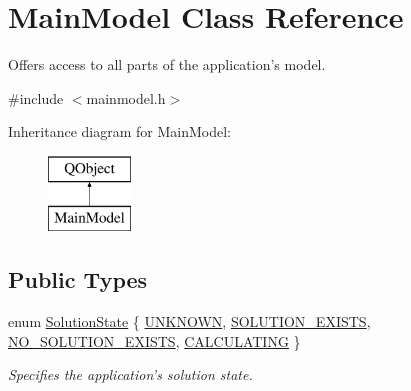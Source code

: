 \hypertarget{classMainModel}{\section{Main\-Model Class Reference}
\label{classMainModel}
}


Offers access to all parts of the application's model.  




{\ttfamily \#include $<$mainmodel.\-h$>$}

Inheritance diagram for Main\-Model\-:\begin{figure}[H]
\begin{center}
\leavevmode
\includegraphics[height=2.000000cm]{classMainModel}
\end{center}
\end{figure}
\subsection*{Public Types}
\begin{DoxyCompactItemize}
\item 
enum \hyperlink{classMainModel_ab0047ea86efa2a40e9aff734f897c330}{Solution\-State} \{ \hyperlink{classMainModel_ab0047ea86efa2a40e9aff734f897c330ab53939240c4a4cba4af14afbd0a88acc}{U\-N\-K\-N\-O\-W\-N}, 
\hyperlink{classMainModel_ab0047ea86efa2a40e9aff734f897c330a380fb36b63f0bc9518789a36c785b027}{S\-O\-L\-U\-T\-I\-O\-N\-\_\-\-E\-X\-I\-S\-T\-S}, 
\hyperlink{classMainModel_ab0047ea86efa2a40e9aff734f897c330a10b96c9ee5c7b402033d5397b00be38d}{N\-O\-\_\-\-S\-O\-L\-U\-T\-I\-O\-N\-\_\-\-E\-X\-I\-S\-T\-S}, 
\hyperlink{classMainModel_ab0047ea86efa2a40e9aff734f897c330a7bc326ea163e937856ec2e520548e7f8}{C\-A\-L\-C\-U\-L\-A\-T\-I\-N\-G}
 \}
\begin{DoxyCompactList}\small\item\em Specifies the application's solution state. \end{DoxyCompactList}\end{DoxyCompactItemize}
